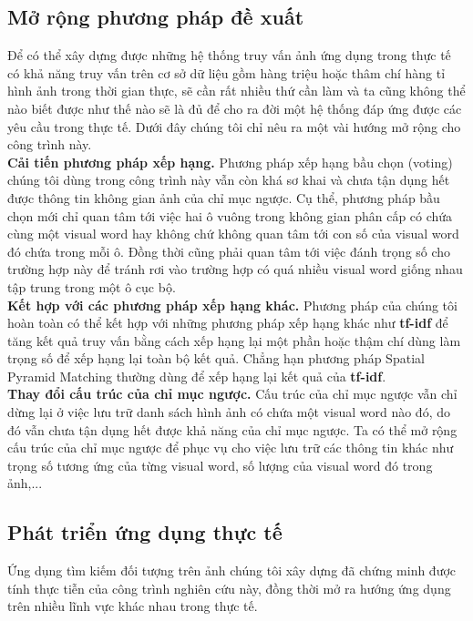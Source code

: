 \subsection{Mở rộng phương pháp đề xuất}
Để có thể xây dựng được những hệ thống truy vấn ảnh ứng dụng trong thực tế có khả năng truy vấn trên cơ sở dữ liệu gồm hàng triệu hoặc thâm chí hàng tỉ hình ảnh trong thời gian thực, sẽ cần rất nhiều thứ cần làm và ta cũng không thể nào biết được như thế nào sẽ là đủ để cho ra đời một hệ thống đáp ứng được các yêu cầu trong thực tế. Dưới đây chúng tôi chỉ nêu ra một vài hướng mở rộng cho công trình này.\\
\textbf{Cải tiến phương pháp xếp hạng.} Phương pháp xếp hạng bầu chọn (voting) chúng tôi dùng trong công trình này vẫn còn khá sơ khai và chưa tận dụng hết được thông tin không gian ảnh của chỉ mục ngược. Cụ thể, phương pháp bầu chọn mới chỉ quan tâm tới việc hai ô vuông trong không gian phân cấp có chứa cùng một visual word hay không chứ không quan tâm tới con số của visual word đó chứa trong mỗi ô. Đồng thời cũng phải quan tâm tới việc đánh trọng số cho trường hợp này để tránh rơi vào trường hợp có quá nhiều visual word giống nhau tập trung trong một ô cục bộ.\\
\textbf{Kết hợp với các phương pháp xếp hạng khác.} Phương pháp của chúng tôi hoàn toàn có thể kết hợp với những phương pháp xếp hạng khác như \textbf{tf-idf} để tăng kết quả truy vấn bằng cách xếp hạng lại một phần hoặc thậm chí dùng làm trọng số để xếp hạng lại toàn bộ kết quả. Chẳng hạn phương pháp Spatial Pyramid Matching thường dùng để xếp hạng lại kết quả của \textbf{tf-idf}.\\ 
\textbf{Thay đổi cấu trúc của chỉ mục ngược.} Cấu trúc của chỉ mục ngược vẫn chỉ dừng lại ở việc lưu trữ danh sách hình ảnh có chứa một visual word nào đó, do đó vẫn chưa tận dụng hết được khả năng của chỉ mục ngược. Ta có thể mở rộng cấu trúc của chỉ mục ngược để phục vụ cho việc lưu trữ các thông tin khác như trọng số tương ứng của từng visual word, số lượng của visual word đó trong ảnh,...\\

\subsection{Phát triển ứng dụng thực tế}
Ứng dụng tìm kiếm đối tượng trên ảnh chúng tôi xây dựng đã chứng minh được tính thực tiễn của công trình nghiên cứu này, đồng thời mở ra hướng ứng dụng trên nhiều lĩnh vực khác nhau trong thực tế.

